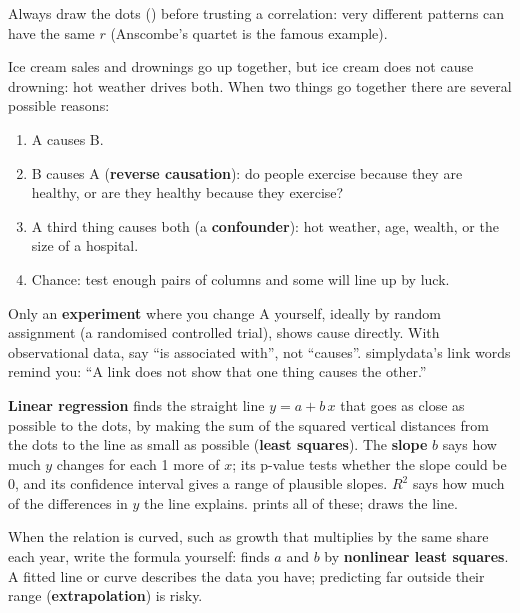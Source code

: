 Always draw the dots () before trusting a correlation: very different patterns
can have the same $r$ (Anscombe's quartet is the famous example).


Ice cream sales and drownings go up together, but ice cream does not cause drowning: hot weather
drives both. When two things go together there are several possible reasons:

\begin{enumerate}
  \item A causes B.
  \item B causes A (\textbf{reverse causation}): do people exercise because they are healthy, or
    are they healthy because they exercise?
  \item A third thing causes both (a \textbf{confounder}): hot weather, age, wealth, or the size of
    a hospital.
  \item Chance: test enough pairs of columns and some will line up by luck.
\end{enumerate}

Only an \textbf{experiment} where you change A yourself, ideally by random assignment (a
randomised controlled trial), shows cause directly. With observational data, say ``is associated
with'', not ``causes''. simplydata's link words remind you: ``A link does not show that one thing
causes the other.''


\textbf{Linear regression} finds the straight line $y = a + b\,x$ that goes as close as possible to
the dots, by making the sum of the squared vertical distances from the dots to the line as small as
possible (\textbf{least squares}). The \textbf{slope} $b$ says how much $y$ changes for each 1 more
of $x$; its p-value tests whether the slope could be 0, and its confidence interval gives a range of
plausible slopes. $R^2$ says how much of the differences in $y$ the line explains.
 prints all of these;
 draws the line.

When the relation is curved, such as growth that multiplies by the same share each year, write the
formula yourself:  finds $a$ and
$b$ by \textbf{nonlinear least squares}. A fitted line or curve describes the data you have;
predicting far outside their range (\textbf{extrapolation}) is risky.

